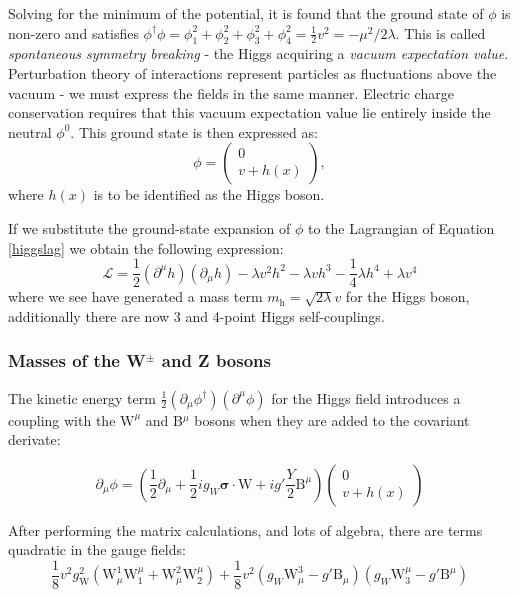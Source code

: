 Solving for the minimum of the potential, it is found that the ground state of $\phi$ is non-zero and satisfies $\phi^{\dagger}\phi = \phi_{1}^{2} + \phi_{2}^{2} + \phi_{3}^{2}  + \phi_{4}^{2} = \frac{1}{2}v^{2} = - \mu^{2}/{2\lambda}$. This is called \textit{spontaneous symmetry breaking} - the Higgs acquiring a \textit{vacuum expectation value}. Perturbation theory of interactions represent particles as fluctuations above the vacuum - we must express the fields in the same manner. Electric charge conservation requires that this vacuum expectation value lie entirely inside the neutral $\phi^{0}$. This ground state is then expressed as: 
\begin{equation}
\phi = \begin{pmatrix} 0 \\  v + h(x) \end{pmatrix},
\end{equation}
where $h(x)$ is to be identified as the Higgs boson.

If we substitute the ground-state expansion of $\phi$ to the Lagrangian of Equation \ref{higgslag} we obtain the following expression:
\begin{equation}
\mathcal{L} = \frac{1}{2}(\partial^{\mu}h)(\partial_{\mu}h) - \lambda v^{2} h^{2} - \lambda vh^{3} - \frac{1}{4}\lambda h^{4} + \lambda v^{4}
\end{equation}
where we see have generated a mass term $m_{\mathrm{h}} = \sqrt{2 \lambda} v$ for the Higgs boson, additionally there are now 3 and 4-point Higgs self-couplings.

\subsubsection{Masses of the W$^{\pm}$ and Z bosons}

The kinetic energy term $\frac{1}{2} (\partial_{\mu}\phi^{\dagger})(\partial^{\mu}\phi)$ for the Higgs field introduces a coupling with the $\bm{\mathrm{W}}^{\mu}$ and B$^{\mu}$ bosons when they are added to the covariant derivate:

\begin{equation}
\partial_{\mu}\phi = (\frac{1}{2}\partial_{\mu} + \frac{1}{2} i g_{W}\bm{\sigma}\cdot\bm{\mathrm{W}} + i g' \frac{Y}{2} \mathrm{B}^{\mu})\begin{pmatrix} 0 \\ v + h(x) \end{pmatrix}
\end{equation}

After performing the matrix calculations, and lots of algebra, there are terms quadratic in the gauge fields:
\begin{equation}
\frac{1}{8} v^{2} g_{\mathrm{W}}^{2} ( \mathrm{W}^{1}_{\mu} \mathrm{W}_{1}^{\mu} + \mathrm{W}^{2}_{\mu} \mathrm{W}_{2}^{\mu}) + \frac{1}{8} v^{2} ( g_{W} \mathrm{W}^{3}_{\mu} - g'\mathrm{B}_{\mu} ) ( g_{W} \mathrm{W}_{3}^{\mu} -g' \mathrm{B}^{\mu} )
\end{equation}

